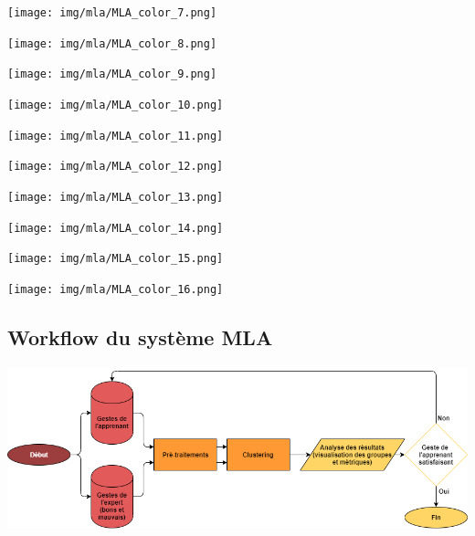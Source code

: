 \documentclass[svgnames]{beamer}
\begin{document}
	\begin{frame}{\subsecname}
	\centering
		\texttt{[image: img/mla/MLA\_color\_7.png]}
	\end{frame}

	\begin{frame}{\subsecname}
	\centering
		\texttt{[image: img/mla/MLA\_color\_8.png]}
	\end{frame}

	\begin{frame}{\subsecname}
	\centering
		\texttt{[image: img/mla/MLA\_color\_9.png]}
	\end{frame}

	\begin{frame}{\subsecname}
	\centering
		\texttt{[image: img/mla/MLA\_color\_10.png]}
	\end{frame}

	\begin{frame}{\subsecname}
	\centering
		\texttt{[image: img/mla/MLA\_color\_11.png]}
	\end{frame}

	\begin{frame}{\subsecname}
	\centering
		\texttt{[image: img/mla/MLA\_color\_12.png]}
	\end{frame}

	\begin{frame}{\subsecname}
	\centering
		\texttt{[image: img/mla/MLA\_color\_13.png]}
	\end{frame}

	\begin{frame}{\subsecname}
	\centering
		\texttt{[image: img/mla/MLA\_color\_14.png]}
	\end{frame}

	\begin{frame}{\subsecname}
	\centering
		\texttt{[image: img/mla/MLA\_color\_15.png]}
	\end{frame}

	\begin{frame}{\subsecname}
	\centering
		\texttt{[image: img/mla/MLA\_color\_16.png]}
	\end{frame}

	\subsection{Workflow du système MLA}
	\begin{frame}{\subsecname}
	\centering
		\includegraphics[scale=0.3]{img/workflow_MLA.png}
	\end{frame}
\end{document}

